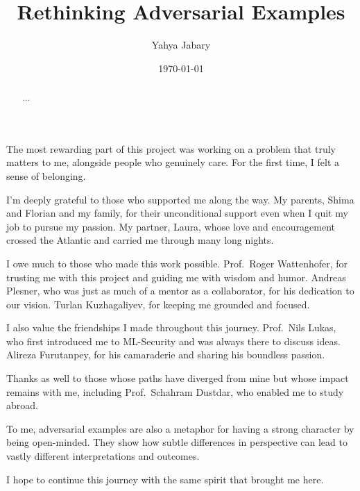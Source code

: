 \documentclass[a4paper, oneside]{discothesis}
\title{Rethinking Adversarial Examples}
\author{Yahya Jabary}
\institute{Computer Engineering and Networks Laboratory \\[2pt] ETH Zürich}
\date{\today}
\begin{document}
\frontmatter
\maketitle

\cleardoublepage

\begin{acknowledgements}
	The most rewarding part of this project was working on a problem that truly matters to me, alongside people who genuinely care. For the first time, I felt a sense of belonging.

	I'm deeply grateful to those who supported me along the way. My parents, Shima and Florian and my family, for their unconditional support \textendash{} even when I quit my job to pursue my passion. My partner, Laura, whose love and encouragement crossed the Atlantic and carried me through many long nights.

	I owe much to those who made this work possible. Prof.\ Roger Wattenhofer, for trusting me with this project and guiding me with wisdom and humor. Andreas Plesner, who was just as much of a mentor as a collaborator, for his dedication to our vision. Turlan Kuzhagaliyev, for keeping me grounded and focused.

	I also value the friendships I made throughout this journey. Prof.\ Nils Lukas, who first introduced me to ML-Security and was always there to discuss ideas. Alireza Furutanpey, for his camaraderie and sharing his boundless passion.

	Thanks as well to those whose paths have diverged from mine but whose impact remains with me, including Prof.\ Schahram Dustdar, who enabled me to study abroad.

	To me, adversarial examples are also a metaphor for having a strong character by being open-minded. They show how subtle differences in perspective can lead to vastly different interpretations and outcomes.
	
	I hope to continue this journey with the same spirit that brought me here.
\end{acknowledgements}

\begin{abstract}
	
	...
\end{abstract}
\end{document}
